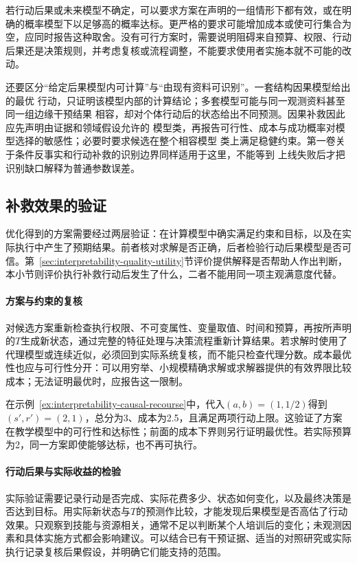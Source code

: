若行动后果或未来模型不确定，可以要求方案在声明的一组情形下都有效，或在明确的概率模型下以足够高的概率达标。更严格的要求可能增加成本或使可行集合为空，应同时报告这种取舍。没有可行方案时，需要说明阻碍来自预算、权限、行动后果还是决策规则，并考虑复核或流程调整，不能要求使用者实施本就不可能的改动。

还要区分“给定后果模型内可计算”与“由现有资料可识别”。一套结构因果模型给出的最优
行动，只证明该模型内部的计算结论；多套模型可能与同一观测资料甚至同一组边缘干预结果
相容，却对个体行动后的状态给出不同预测。因果补救因此应先声明由证据和领域假设允许的
模型类，再报告可行性、成本与成功概率对模型选择的敏感性；必要时要求候选在整个相容模型
类上满足稳健约束。第一卷关于条件反事实和行动补救的识别边界同样适用于这里，不能等到
上线失败后才把识别缺口解释为普通参数误差。

\subsection{补救效果的验证}
\label{sec:interpretability-recourse-validation}

优化得到的方案需要经过两层验证：在计算模型中确实满足约束和目标，以及在实际执行中产生了预期结果。前者核对求解是否正确，后者检验行动后果模型是否可信。第~\ref{sec:interpretability-quality-utility}节评价提供解释是否帮助人作出判断，本小节则评价执行补救行动后发生了什么，二者不能用同一项主观满意度代替。

\paragraph{方案与约束的复核}

对候选方案重新检查执行权限、不可变属性、变量取值、时间和预算，再按所声明的$T$生成新状态，通过完整的特征处理与决策流程重新计算结果。若求解时使用了代理模型或连续近似，必须回到实际系统复核，而不能只检查代理分数。成本最优性也应与可行性分开：可以用穷举、小规模精确求解或求解器提供的有效界限比较成本；无法证明最优时，应报告这一限制。

在示例~\ref{ex:interpretability-causal-recourse}中，代入$(a,b)=(1,1/2)$得到$(s',r')=(2,1)$，总分为3、成本为2.5，且满足两项行动上限。这验证了方案在教学模型中的可行性和达标性；前面的成本下界则另行证明最优性。若实际预算为2，同一方案即使能够达标，也不再可执行。

\paragraph{行动后果与实际收益的检验}

实际验证需要记录行动是否完成、实际花费多少、状态如何变化，以及最终决策是否达到目标。用实际新状态与$T$的预测作比较，才能发现后果模型是否高估了行动效果。只观察到技能与资源相关，通常不足以判断某个人培训后的变化；未观测因素和具体实施方式都会影响建议。可以结合已有干预证据、适当的对照研究或实际执行记录复核后果假设，并明确它们能支持的范围。

